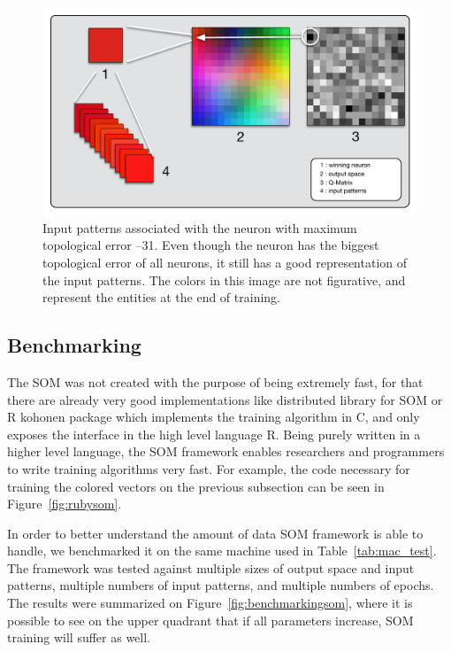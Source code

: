 \documentclass[journal]{IEEEtran}
\begin{document}
\begin{figure}[h!]
  \centering
  \includegraphics[width=1\linewidth]{./images/som_trainned.pdf}
  \caption{Input patterns associated with the neuron with maximum topological error --31. Even though the neuron has the biggest topological error of all neurons, it still has a good representation of the input patterns. The colors in this image are not figurative, and represent the entities at the end of training.  }
  \label{fig:somtrained}
\end{figure}

\subsection{Benchmarking}
\label{sub:benchmarking}
The \ac{SOM} was not created with the purpose of being extremely fast, for that there are already very good implementations like \citet{somoclu} distributed library for \ac{SOM} or \citet{rsom} R kohonen package which implements the training algorithm in C, and only exposes the interface in the high level language R.  
Being purely written in a higher level language, the \ac{SOM} framework enables researchers and programmers to write training algorithms very fast. For example, the code necessary for training the colored vectors on the previous subsection can be seen in Figure~\ref{fig:rubysom}.

In order to better understand the amount of data \ac{SOM} framework is able to handle, we benchmarked it on the same machine used in Table~\ref{tab:mac_test}. The framework was tested against multiple sizes of output space and input patterns, multiple numbers of input patterns, and multiple numbers of epochs. 
The results were summarized on Figure~\ref{fig:benchmarkingsom}, where it is possible to see on the upper quadrant that if all parameters increase, \ac{SOM} training will suffer as well.
\end{document}
